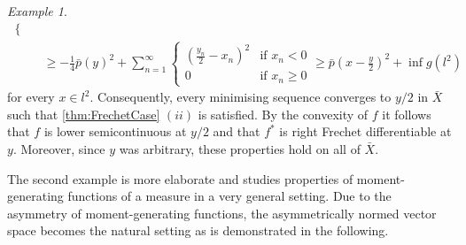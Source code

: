 \documentclass[
	paper=A4,
	pagesize=auto,
	fontsize=12pt
]{scrartcl}
\theoremstyle{plain}
\theoremstyle{remark}
\newtheorem{example}[theorem]{Example}
\theoremstyle{definition}
\begin{document}
\begin{example}
\begin{equation}
\begin{aligned}
\begin{cases}
\end{cases} \\
&\ge
- \frac{1}{4} \bar{p} \left( y \right)^2
+ \sum_{n = 1}^\infty
\begin{cases}
\left( \frac{y_n}{2} - x_n \right)^2 & \text{if } x_n < 0 \\
0 & \text{if } x_n \ge 0
\end{cases}
\ge
\bar{p} \left( x - \frac{y}{2} \right)^2
+ \inf g \left( l^2 \right)
\end{aligned}
\end{equation}
%
for every $x \in l^2$.
Consequently, every minimising sequence converges to $y/2$ in $\bar{X}$ such that \cref{thm:FrechetCase} $(ii)$ is satisfied.
By the convexity of $f$ it follows that $f$ is lower semicontinuous at $y/2$ and that $f^*$ is right Frechet differentiable at $y$.
Moreover, since $y$ was arbitrary, these properties hold on all of $\bar{X}$.
\end{example}
%
The second example is more elaborate and studies properties of moment-generating functions of a measure in a very general setting.
Due to the asymmetry of moment-generating functions, the asymmetrically normed vector space becomes the natural setting as is demonstrated in the following.
%
\end{document}
